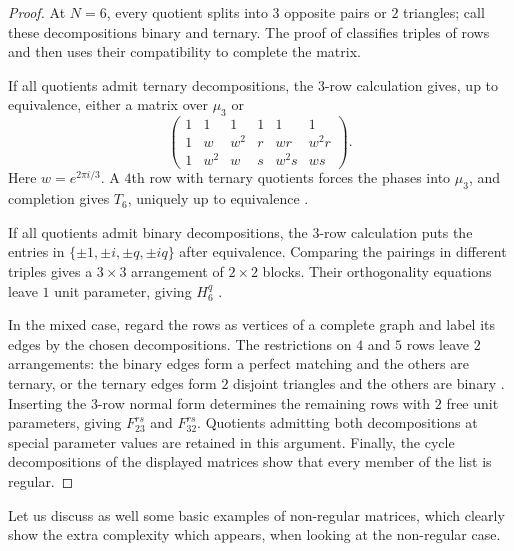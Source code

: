 \documentclass[11pt,a4paper]{article}
\theoremstyle{plain}
\theoremstyle{definition}
\numberwithin{equation}{section}
\begin{document}
\begin{proof}
At $N=6$, every quotient splits into $3$ opposite pairs or $2$ triangles; call these decompositions binary and ternary. The proof of \cite[Theorem 11.2]{bbs} classifies triples of rows and then uses their compatibility to complete the matrix.

If all quotients admit ternary decompositions, the $3$-row calculation gives, up to equivalence, either a matrix over $\mu_3$ or
$$\begin{pmatrix}1&1&1&1&1&1\\1&w&w^2&r&wr&w^2r\\1&w^2&w&s&w^2s&ws\end{pmatrix}.$$
Here $w=e^{2\pi i/3}$. A $4$th row with ternary quotients forces the phases into $\mu_3$, and completion gives $T_6$, uniquely up to equivalence \cite[Lemmas 8.1--8.2 and Theorem 8.3]{bbs}.

If all quotients admit binary decompositions, the $3$-row calculation puts the entries in $\{\pm1,\pm i,\pm q,\pm iq\}$ after equivalence. Comparing the pairings in different triples gives a $3\times3$ arrangement of $2\times2$ blocks. Their orthogonality equations leave $1$ unit parameter, giving $H_6^q$ \cite[Lemma 9.1 and Theorem 9.2]{bbs}.

In the mixed case, regard the rows as vertices of a complete graph and label its edges by the chosen decompositions. The restrictions on $4$ and $5$ rows leave $2$ arrangements: the binary edges form a perfect matching and the others are ternary, or the ternary edges form $2$ disjoint triangles and the others are binary \cite[Section 10]{bbs}. Inserting the $3$-row normal form determines the remaining rows with $2$ free unit parameters, giving $F_{23}^{rs}$ and $F_{32}^{rs}$. Quotients admitting both decompositions at special parameter values are retained in this argument. Finally, the cycle decompositions of the displayed matrices show that every member of the list is regular.
\end{proof}

\label{bg:nonregular}Let us discuss as well some basic examples of non-regular matrices, which clearly show the extra complexity which appears, when looking at the non-regular case.
\end{document}
